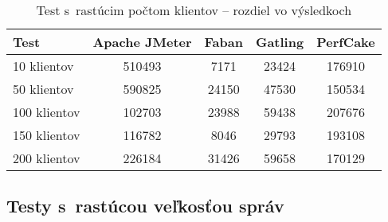 \documentclass[12pt,oneside,final]{fithesis-utf8}
\begin{document}
\begin{itemize}
\begin{table}[H]
\begin{center}
\begin{tabular}{ | l | c | c | c | c |}
		\hline
		 \textbf{Test} & \textbf{Apache JMeter} & \textbf{Faban} & \textbf{Gatling} & \textbf{PerfCake} \\ \hline
		 10 klientov & 510493 & 7171 & 23424 & 176910 \\ \hline
		 50 klientov & 590825 & 24150 & 47530 & 150534 \\ \hline
		 100 klientov & 102703 & 23988 & 59438 & 207676 \\ \hline
		 150 klientov & 116782 & 8046 & 29793 & 193108 \\ \hline
		 200 klientov & 226184 & 31426 & 59658 & 170129 \\ \hline
		 
\end{tabular}
\end{center}
\caption{Test s~rastúcim počtom klientov -- rozdiel vo výsledkoch}
\end{table}

\end{itemize}

\subsection{Testy s~rastúcou veľkosťou správ}
\end{document}
